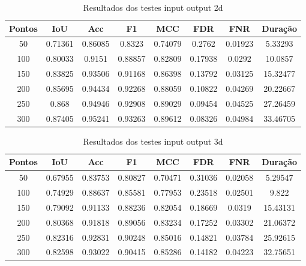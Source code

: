 \begin{table}[h]
            \centering
            \caption{Resultados dos testes input output 2d}
            \label{tab:final_input_output_2d}
            \begin{tabular}{|c|c|c|c|c|c|c|c|}
                \hline
                                Pontos & IoU & Acc & F1 & MCC & FDR & FNR & Duração \\
                \hline
                50 & 0.71361 & 0.86085 & 0.8323 & 0.74079 & 0.2762 & 0.01923 & 5.33293\\
        100 & 0.80033 & 0.9151 & 0.88857 & 0.82809 & 0.17938 & 0.0292 & 10.0857\\
        150 & 0.83825 & 0.93506 & 0.91168 & 0.86398 & 0.13792 & 0.03125 & 15.32477\\
        200 & 0.85695 & 0.94434 & 0.92268 & 0.88059 & 0.10822 & 0.04269 & 20.22667\\
        250 & 0.868 & 0.94946 & 0.92908 & 0.89029 & 0.09454 & 0.04525 & 27.26459\\
        300 & 0.87405 & 0.95241 & 0.93263 & 0.89612 & 0.08326 & 0.04984 & 33.46705\\
                \hline
            \end{tabular}
        \end{table}


\begin{table}[h]
            \centering
            \caption{Resultados dos testes input output 3d}
            \label{tab:final_input_output_3d}
            \begin{tabular}{|c|c|c|c|c|c|c|c|}
                \hline
                                Pontos & IoU & Acc & F1 & MCC & FDR & FNR & Duração \\
                \hline
                50 & 0.67955 & 0.83753 & 0.80827 & 0.70471 & 0.31036 & 0.02058 & 5.29547\\
        100 & 0.74929 & 0.88637 & 0.85581 & 0.77953 & 0.23518 & 0.02501 & 9.822\\
        150 & 0.79092 & 0.91133 & 0.88236 & 0.82054 & 0.18669 & 0.0319 & 15.43131\\
        200 & 0.80368 & 0.91818 & 0.89056 & 0.83234 & 0.17252 & 0.03302 & 21.06372\\
        250 & 0.82316 & 0.92831 & 0.90248 & 0.85016 & 0.14821 & 0.03784 & 25.92615\\
        300 & 0.82598 & 0.93022 & 0.90415 & 0.85286 & 0.14182 & 0.04223 & 32.75651\\
                \hline
            \end{tabular}
        \end{table}


